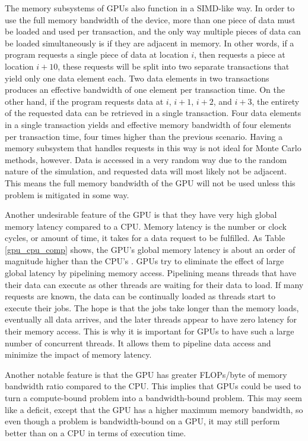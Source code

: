 The memory subsystems of GPUs also function in a SIMD-like way.  In order to use the full memory bandwidth of the device, more than one piece of data must be loaded and used per transaction, and the only way multiple pieces of data can be loaded simultaneously is if they are adjacent in memory.  In other words, if a program requests a single piece of data at location $i$, then requests a piece at location $i+10$, these requests will be split into two separate transactions that yield only one data element each.  Two data elements in two transactions produces an effective bandwidth of one element per transaction time.   On the other hand, if the program requests data at $i$, $i+1$, $i+2$, and $i+3$, the entirety of the requested data can be retrieved in a single transaction.  Four data elements in a single transaction yields and effective memory bandwidth of four elements per transaction time, four times higher than the previous scenario.  Having a memory subsystem that handles requests in this way is not ideal for Monte Carlo methods, however.  Data is accessed in a very random way due to the random nature of the simulation, and requested data will most likely not be adjacent.  This means the full memory bandwidth of the GPU will not be used unless this problem is mitigated in some way.

Another undesirable feature of the GPU is that they have very high global memory latency compared to a CPU.  Memory latency is the number or clock cycles, or amount of time, it takes for a data request to be fulfilled.  As Table \ref{gpu_cpu_comp} shows, the GPU's global memory latency is about an order of magnitude higher than the CPU's \cite{cpu_latency,cuda}.  GPUs try to eliminate the effect of large global latency by pipelining memory access.  Pipelining means threads that have their data can execute as other threads are waiting for their data to load.  If many requests are known, the data can be continually loaded as threads start to execute their jobs.  The hope is that the jobs take longer than the memory loads, eventually all data arrives, and the later threads appear to have zero latency for their memory access.  This is why it is important for GPUs to have such a large number of concurrent threads.  It allows them to pipeline data access and minimize the impact of memory latency.

Another notable feature is that the GPU has greater FLOPs/byte of memory bandwidth ratio compared to the CPU.  This implies that GPUs could be used to turn a compute-bound problem into a bandwidth-bound problem.  This may seem like a deficit, except that the GPU has a higher maximum memory bandwidth, so even though a problem is bandwidth-bound on a GPU, it may still perform better than on a CPU in terms of execution time.

